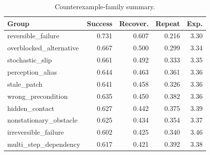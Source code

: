 \begin{table}[t]
\centering
\caption{Counterexample-family summary.}
\label{tab:counter-summary}
\small
\begin{tabular}{lrrrr}
\toprule
Group & Success & Recover. & Repeat & Exp. \\
\midrule
reversible\_failure & 0.731 & 0.607 & 0.216 & 3.30 \\
overblocked\_alternative & 0.667 & 0.500 & 0.299 & 3.34 \\
stochastic\_slip & 0.661 & 0.492 & 0.333 & 3.35 \\
perception\_alias & 0.644 & 0.463 & 0.361 & 3.36 \\
stale\_patch & 0.641 & 0.458 & 0.326 & 3.36 \\
wrong\_precondition & 0.635 & 0.450 & 0.382 & 3.36 \\
hidden\_contact & 0.627 & 0.442 & 0.375 & 3.39 \\
nonstationary\_obstacle & 0.625 & 0.434 & 0.354 & 3.37 \\
irreversible\_failure & 0.602 & 0.425 & 0.340 & 3.46 \\
multi\_step\_dependency & 0.617 & 0.421 & 0.392 & 3.38 \\
\bottomrule
\end{tabular}
\end{table}
